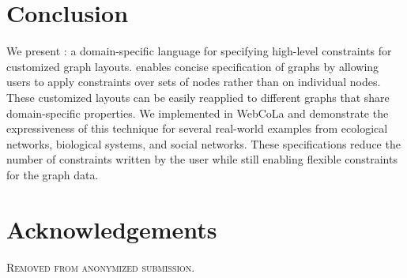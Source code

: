 \section{Conclusion}
We present \projectname: a domain-specific language for specifying high-level
constraints for customized graph layouts. \projectname enables concise 
specification of graphs by allowing users to apply constraints over sets
of nodes rather than on individual nodes. These customized layouts can
be easily reapplied to different graphs that share domain-specific properties.
We implemented \projectname in WebCoLa and demonstrate the expressiveness
of this technique for several real-world examples from ecological networks,
biological systems, and social networks. These specifications reduce the
number of constraints written by the user while still enabling flexible
constraints for the graph data.

\section*{Acknowledgements}
\textsc{Removed from anonymized submission.}

